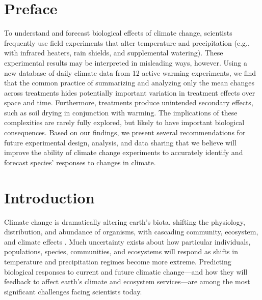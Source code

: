 \documentclass{article}
\begin{document}
\section* {Preface} 
\par To understand and forecast biological effects of climate change, scientists frequently use field experiments that alter temperature and precipitation (e.g., with infrared heaters, rain shields, and supplemental watering). These experimental results may be interpreted in misleading ways, however. Using a new database of daily climate data from 12 active warming experiments, we find that the common practice of summarizing and analyzing only the mean changes across treatments hides potentially important variation in treatment effects over space and time. Furthermore, treatments produce unintended secondary effects, such as soil drying in conjunction with warming. The implications of these complexities are rarely fully explored, but likely to have important biological consequences. Based on our findings, we present several recommendations for future experimental design, analysis, and data sharing that we believe will improve the ability of climate change experiments to accurately identify and forecast species' responses to changes in climate.
\section* {Introduction}
\par Climate change is dramatically altering earth's biota, shifting the physiology, distribution, and abundance of organisms, with cascading community, ecosystem, and climate effects \citep{shukla1982,cox2000,thomas2004,parmesan2006,field2007,sheldon2011,urban2012}. Much uncertainty exists about how particular individuals, populations, species, communities, and ecosystems will respond as shifts in temperature and precipitation regimes become more extreme. Predicting biological responses to current and future climatic change---and how they will feedback to affect earth's climate and ecosystem services---are among the most significant challenges facing scientists today.
\end{document}
